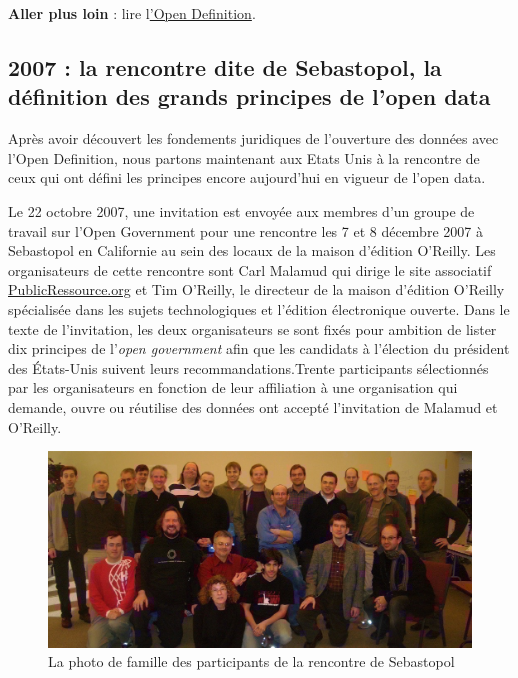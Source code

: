 \documentclass[]{book}
\theoremstyle{definition}
\theoremstyle{definition}
\theoremstyle{definition}
\theoremstyle{remark}
\begin{document}
\textbf{Aller plus loin} : lire
l\href{http://opendefinition.org/od/1.1/fr/}{'Open Definition}.

\subsection{2007 : la rencontre dite de Sebastopol, la définition des
grands principes de l'open
data}\label{la-rencontre-dite-de-sebastopol-la-definition-des-grands-principes-de-lopen-data}

Après avoir découvert les fondements juridiques de l'ouverture des
données avec l'Open Definition, nous partons maintenant aux Etats Unis à
la rencontre de ceux qui ont défini les principes encore aujourd'hui en
vigueur de l'open data.

Le 22 octobre 2007, une invitation est envoyée aux membres d'un groupe
de travail sur l'Open Government pour une rencontre les 7 et 8 décembre
2007 à Sebastopol en Californie au sein des locaux de la maison
d'édition O'Reilly. Les organisateurs de cette rencontre sont Carl
Malamud qui dirige le site associatif \url{PublicRessource.org} et Tim
O'Reilly, le directeur de la maison d'édition O'Reilly spécialisée dans
les sujets technologiques et l'édition électronique ouverte. Dans le
texte de l'invitation, les deux organisateurs se sont fixés pour
ambition de lister dix principes de l'\emph{open government} afin que
les candidats à l'élection du président des États-Unis suivent leurs
recommandations.Trente participants sélectionnés par les organisateurs
en fonction de leur affiliation à une organisation qui demande, ouvre ou
réutilise des données ont accepté l'invitation de Malamud et O'Reilly.

\begin{figure}

{\centering \includegraphics[width=0.7\linewidth]{./img/photofamille} 

}

\caption{La photo de famille des participants de la rencontre de Sebastopol}\label{fig:unnamed-chunk-1}
\end{figure}
\end{document}
